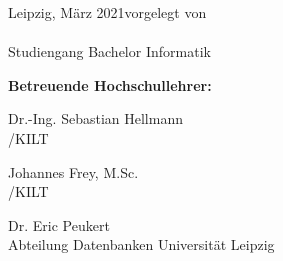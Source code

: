 \begin{titlepage}
\begin{center}
  
    
    
\vspace{5cm}




  
		\renewcommand{\arraystretch}{1}
  \end{center}
  
Leipzig, März 2021\hfill vorgelegt von \\[3mm]
\hspace*{\fill} {\large \myfirstname~\mylastname}\\
\hspace*{\fill} Studiengang Bachelor Informatik

\vspace{1cm}

{\large \textbf{Betreuende Hochschullehrer:}}

{\large Dr.-Ing. Sebastian Hellmann }\\
\mycompany/KILT

{\large Johannes Frey, M.Sc. }\\
\mycompany/KILT

{\large Dr. Eric Peukert}\\
Abteilung Datenbanken Universität Leipzig
  
\end{titlepage}

